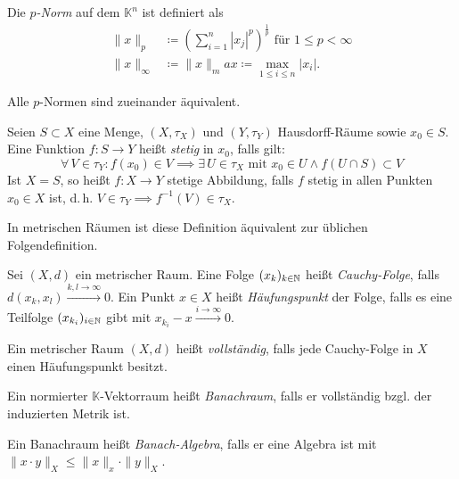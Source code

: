 \documentclass{cheat-sheet}
\newcommand{\K}{\mathbb{K}}
\newcommand{\convWith}[1]{\xrightarrow{#1 \to \infty}} %
\begin{document}
\begin{defn}
  Die \emph{$p$-Norm} auf dem $\K^n$ ist definiert als
  \begin{align*}
    \| x \|_p &\coloneqq \left( \sum_{i = 1}^n |x_j|^p \right)^{\frac{1}{p}} \text{ für } 1 \leq p < \infty \\
    \| x \|_{\infty} &\coloneqq \| x \|_max \coloneqq \max_{1 \leq i \leq n} |x_i|.
  \end{align*}
\end{defn}

\begin{bem}
  Alle $p$-Normen sind zueinander äquivalent.
\end{bem}

\begin{defn}
  Seien $S \subset X$ eine Menge, $(X, \tau_X)$ und $(Y, \tau_Y)$ Hausdorff-Räume sowie $x_0 \in S$. Eine Funktion $f : S \to Y$ heißt \emph{stetig} in $x_0$, falls gilt:
  \[ \forall\,V \in \tau_Y : f(x_0) \in V \implies \exists\,U \in \tau_X \text{ mit } x_0 \in U \wedge f(U \cap S) \subset V \]
  Ist $X = S$, so heißt $f : X \to Y$ stetige Abbildung, falls $f$ stetig in allen Punkten $x_0 \in X$ ist, d.\,h. $V \in \tau_Y \implies f^{-1}(V) \in \tau_X$.
\end{defn}

\begin{bem}
  In metrischen Räumen ist diese Definition äquivalent zur üblichen Folgendefinition.
\end{bem}

\begin{defn}
  Sei $(X, d)$ ein metrischer Raum. Eine Folge $(x_k)_{k \in \mathbb{N}}$ heißt \emph{Cauchy-Folge}, falls $d(x_k, x_l) \convWith{k, l} 0$. Ein Punkt $x \in X$ heißt \emph{Häufungspunkt} der Folge, falls es eine Teilfolge $(x_{k_i})_{i \in \mathbb{N}}$ gibt mit $x_{k_i} - x \convWith{i} 0$.
\end{defn}

\begin{defn}
  Ein metrischer Raum $(X, d)$ heißt \emph{vollständig}, falls jede Cauchy-Folge in $X$ einen Häufungspunkt besitzt.
\end{defn}

\begin{defn}
  Ein normierter $\K$-Vektorraum heißt \emph{Banachraum}, falls er vollständig bzgl. der induzierten Metrik ist.
\end{defn}

\begin{defn}
  Ein Banachraum heißt \emph{Banach-Algebra}, falls er eine Algebra ist mit $\| x \cdot y \|_X \leq \| x \|_x \cdot \| y \|_X$.
\end{defn}
\end{document}
